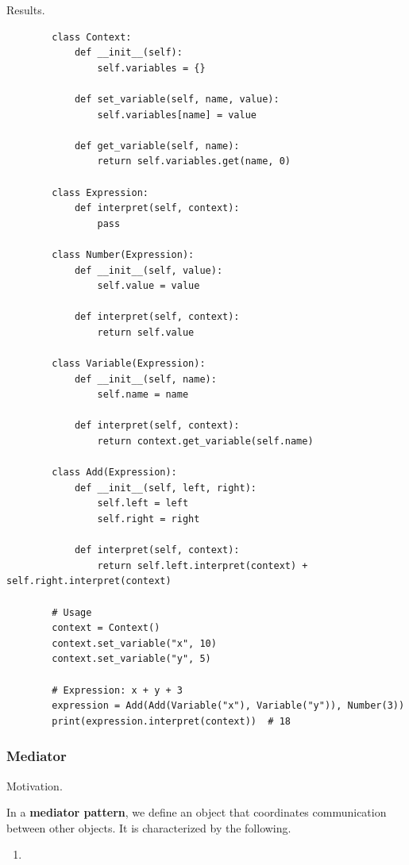     Results. 

    \begin{example}
      \label{ex:case-study-10}
      \begin{lstlisting}
        class Context:
            def __init__(self):
                self.variables = {}
            
            def set_variable(self, name, value):
                self.variables[name] = value
            
            def get_variable(self, name):
                return self.variables.get(name, 0)

        class Expression:
            def interpret(self, context):
                pass

        class Number(Expression):
            def __init__(self, value):
                self.value = value
            
            def interpret(self, context):
                return self.value

        class Variable(Expression):
            def __init__(self, name):
                self.name = name
            
            def interpret(self, context):
                return context.get_variable(self.name)

        class Add(Expression):
            def __init__(self, left, right):
                self.left = left
                self.right = right
            
            def interpret(self, context):
                return self.left.interpret(context) + self.right.interpret(context)

        # Usage
        context = Context()
        context.set_variable("x", 10)
        context.set_variable("y", 5)

        # Expression: x + y + 3
        expression = Add(Add(Variable("x"), Variable("y")), Number(3))
        print(expression.interpret(context))  # 18 
      \end{lstlisting}
    \end{example}

  \subsubsection{Mediator}

    Motivation. 

    \begin{definition}
      \label{def:mediator-pattern}
      In a \textbf{mediator pattern}, we define an object that coordinates communication between other objects. It is characterized by the following. 
      \begin{enumerate}
        \item 
      \end{enumerate}
    \end{definition}

